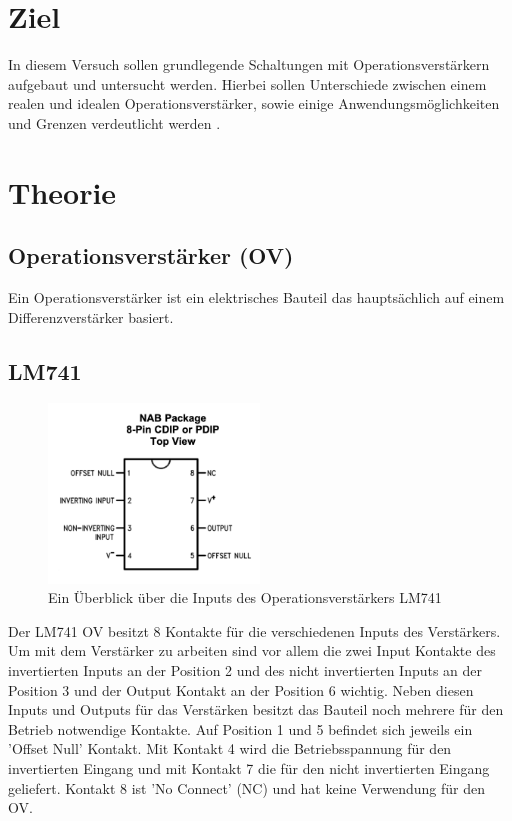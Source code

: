 \section*{Ziel}
    In diesem Versuch sollen grundlegende Schaltungen mit Operationsverstärkern aufgebaut und untersucht werden.
    Hierbei sollen Unterschiede zwischen einem realen und idealen Operationsverstärker, sowie einige Anwendungsmöglichkeiten und Grenzen verdeutlicht werden \cite{anleitung}.
\section{Theorie}
    \label{sec:theorie}
    \subsection{Operationsverstärker (OV)}
    Ein Operationsverstärker ist ein elektrisches Bauteil das hauptsächlich auf einem Differenzverstärker basiert.
    \subsection{LM741}
        \begin{figure}[ht]
            \centering
            \includegraphics[width = 0.5\textwidth]{bilder/LM741.png}
            \caption{Ein Überblick über die Inputs des Operationsverstärkers LM741}
            \label{fig:LM741}
        \end{figure}
        Der LM741 OV besitzt 8 Kontakte für die verschiedenen Inputs des Verstärkers.
        Um mit dem Verstärker zu arbeiten sind vor allem die zwei Input Kontakte des invertierten Inputs an der Position 2 und des nicht invertierten Inputs an der Position 3 und der Output Kontakt an der Position 6 wichtig.
        Neben diesen Inputs und Outputs für das Verstärken besitzt das Bauteil noch mehrere für den Betrieb notwendige Kontakte.
        Auf Position 1 und 5 befindet sich jeweils ein 'Offset Null' Kontakt.
        Mit Kontakt 4 wird die Betriebsspannung für den invertierten Eingang und mit Kontakt 7 die für den nicht invertierten Eingang geliefert.
        Kontakt 8 ist 'No Connect' (NC) und hat keine Verwendung für den OV.
